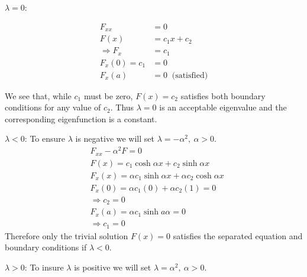 \vspace{0.1cm}

\noindent\underline{$\lambda = 0$}:

\begin{align*}
F_{xx} &= 0 \\
F(x) &= c_1x + c_2 \\
\Rightarrow F_{x} &= c_1 \\
F_x(0) = c_1 &= 0 \\ 
F_{x}(a) &= 0 \ \text{ (satisfied)}
\end{align*}

\vspace{0.1cm}

\noindent We see that, while $c_1$ must be zero, $F(x)=c_2$ satisfies both boundary conditions for any value of $c_2$.  Thus $\lambda = 0$ is an acceptable eigenvalue and the corresponding eigenfunction is a constant.

\vspace{0.1cm}

\noindent\underline{$\lambda < 0$}: To ensure $\lambda$ is negative we will set $\lambda = -\alpha^2, \ \alpha>0$.
\begin{align*}
&F_{xx} - \alpha^2 F = 0 \\
&F(x) = c_1 \cosh{\alpha x} + c_2 \sinh{\alpha x} \\
&F_x(x) = \alpha c_1 \sinh{\alpha x} + \alpha c_2 \cosh{\alpha x} \\
&F_x(0) = \alpha c_1 (0) + \alpha c_2 (1) = 0 \\
&\Rightarrow c_2 = 0 \\
&F_x(a) = \alpha c_1 \sinh{a \alpha} = 0\\
&\Rightarrow c_1 = 0
\end{align*}
Therefore only the trivial solution $F(x)=0$ satisfies the separated equation and boundary conditions if $\lambda < 0$.

\vspace{0.5cm}

\noindent\underline{$\lambda > 0$}: To insure $\lambda$ is positive we will set $\lambda = \alpha^2, \ \alpha>0$.

